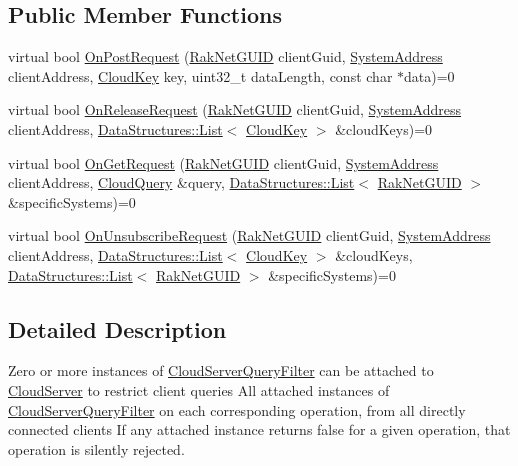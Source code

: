 \subsection*{Public Member Functions}
\begin{DoxyCompactItemize}
\item 
virtual bool \hyperlink{class_rak_net_1_1_cloud_server_query_filter_ac9946f05f5538c2df31f52d3cd04022e}{On\-Post\-Request} (\hyperlink{struct_rak_net_1_1_rak_net_g_u_i_d}{Rak\-Net\-G\-U\-I\-D} client\-Guid, \hyperlink{struct_rak_net_1_1_system_address}{System\-Address} client\-Address, \hyperlink{struct_rak_net_1_1_cloud_key}{Cloud\-Key} key, uint32\-\_\-t data\-Length, const char $\ast$data)=0
\item 
virtual bool \hyperlink{class_rak_net_1_1_cloud_server_query_filter_a0d922029a3b2af25c1ef38e05faa650d}{On\-Release\-Request} (\hyperlink{struct_rak_net_1_1_rak_net_g_u_i_d}{Rak\-Net\-G\-U\-I\-D} client\-Guid, \hyperlink{struct_rak_net_1_1_system_address}{System\-Address} client\-Address, \hyperlink{class_data_structures_1_1_list}{Data\-Structures\-::\-List}$<$ \hyperlink{struct_rak_net_1_1_cloud_key}{Cloud\-Key} $>$ \&cloud\-Keys)=0
\item 
virtual bool \hyperlink{class_rak_net_1_1_cloud_server_query_filter_a56313b9028fbf698de696809f74f7691}{On\-Get\-Request} (\hyperlink{struct_rak_net_1_1_rak_net_g_u_i_d}{Rak\-Net\-G\-U\-I\-D} client\-Guid, \hyperlink{struct_rak_net_1_1_system_address}{System\-Address} client\-Address, \hyperlink{struct_rak_net_1_1_cloud_query}{Cloud\-Query} \&query, \hyperlink{class_data_structures_1_1_list}{Data\-Structures\-::\-List}$<$ \hyperlink{struct_rak_net_1_1_rak_net_g_u_i_d}{Rak\-Net\-G\-U\-I\-D} $>$ \&specific\-Systems)=0
\item 
virtual bool \hyperlink{class_rak_net_1_1_cloud_server_query_filter_a71bdd156eda25bdb3c63f2d86ae2f571}{On\-Unsubscribe\-Request} (\hyperlink{struct_rak_net_1_1_rak_net_g_u_i_d}{Rak\-Net\-G\-U\-I\-D} client\-Guid, \hyperlink{struct_rak_net_1_1_system_address}{System\-Address} client\-Address, \hyperlink{class_data_structures_1_1_list}{Data\-Structures\-::\-List}$<$ \hyperlink{struct_rak_net_1_1_cloud_key}{Cloud\-Key} $>$ \&cloud\-Keys, \hyperlink{class_data_structures_1_1_list}{Data\-Structures\-::\-List}$<$ \hyperlink{struct_rak_net_1_1_rak_net_g_u_i_d}{Rak\-Net\-G\-U\-I\-D} $>$ \&specific\-Systems)=0
\end{DoxyCompactItemize}


\subsection{Detailed Description}
Zero or more instances of \hyperlink{class_rak_net_1_1_cloud_server_query_filter}{Cloud\-Server\-Query\-Filter} can be attached to \hyperlink{class_rak_net_1_1_cloud_server}{Cloud\-Server} to restrict client queries All attached instances of \hyperlink{class_rak_net_1_1_cloud_server_query_filter}{Cloud\-Server\-Query\-Filter} on each corresponding operation, from all directly connected clients If any attached instance returns false for a given operation, that operation is silently rejected. 

